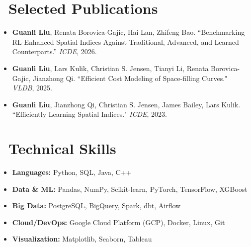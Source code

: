 \documentclass{resume}
\begin{document}
\section{\faFile\ \textbf{Selected Publications}}
\begin{itemize}
  \item \textbf{Guanli Liu}, Renata Borovica-Gajic, Hai Lan, Zhifeng Bao.  
``Benchmarking RL-Enhanced Spatial Indices Against Traditional, Advanced, and Learned Counterparts.''  
\textit{ICDE}, 2026. 

 \item \textbf{Guanli Liu}, Lars Kulik, Christian S. Jensen, Tianyi Li, Renata Borovica-Gajic, Jianzhong Qi.  
  ``Efficient Cost Modeling of Space-filling Curves." \textit{VLDB}, 2025.  


  \item \textbf{Guanli Liu}, Jianzhong Qi, Christian S. Jensen, James Bailey, Lars Kulik.  
  ``Efficiently Learning Spatial Indices." \textit{ICDE}, 2023.  
\end{itemize}

\section{\faCogs\ \textbf{Technical Skills}}
\begin{itemize}[parsep=0.5ex]
  \item \textbf{Languages:} Python, SQL, Java, C++
  \item \textbf{Data \& ML:} Pandas, NumPy, Scikit-learn, PyTorch, TensorFlow, XGBoost
  \item \textbf{Big Data:} PostgreSQL, BigQuery, Spark, dbt, Airflow
  \item \textbf{Cloud/DevOps:} Google Cloud Platform (GCP), Docker, Linux, Git
  \item \textbf{Visualization:} Matplotlib, Seaborn, Tableau
\end{itemize}
\end{document}
